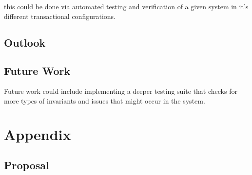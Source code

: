 \documentclass[a4paper,10pt,titlepage]{report}
\begin{document}
    this could be done via automated testing and verification of a given system in it's different transactional configurations.

    \section*{Outlook}


    \section{Future Work}
    Future work could include implementing a deeper testing suite that checks for more types of invariants and issues that might occur in the system.





    \newpage


    \chapter{Appendix}

    \pagestyle{empty}
    \printbibliography


    \section{Proposal}
    



\end{document}
